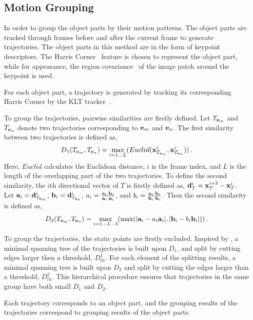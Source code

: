 \documentclass[10pt,twocolumn,letterpaper]{article}
\begin{document}
\subsection{Motion Grouping}
In order to group the object parts by their motion patterns. The object parts are tracked through frames before and after the current frame to generate trajectories. The object parts in this method are in the form of keypoint descriptors. The Harris Corner~\cite{harris} feature is chosen to represent the object part, while for appearance, the region covariance~\cite{regionc} of the image patch around the keypoint is used.

For each object part, a trajectory is generated by tracking its corresponding Harris Corner by the KLT tracker~\cite{ij2}.

To group the trajectories, pairwise similarities are firstly defined. Let $T_{{\bf{e}}_m}$ and $T_{{\bf{e}}_n}$ denote two trajectories corresponding to ${{\bf{e}}_m}$ and ${{\bf{e}}_n}$. The first similarity between two trajectories is defined as,
\[
{D_1}(T_{{\bf{e}}_m},T_{{\bf{e}}_n}) = \mathop {\max }\limits_{i=1...L} (Euclid({\bf{x}}^i_{T_{{\bf{e}}_m}},{\bf{x}}^i_{T_{{\bf{e}}_n}}))\:.
\]
Here, $Euclid$ calculates the Euclidean distance, $i$ is the frame index, and $L$ is the length of the overlapping part of the two trajectories.
To define the second similarity, the $i$th directional vector of $T$ is firstly defined as, ${\bf{d}}^i_T={\bf{x}}^{i+3}_{T}-{\bf{x}}^i_{T}$. Let ${\bf{a}}_i={\bf{d}}^i_{T_{{\bf{e}}_m}}$, ${\bf{b}}_i={\bf{d}}^i_{T_{{\bf{e}}_n}}$, $a_i=\frac{{{{\bf{a}}_i}\cdot{{\bf{b}}_i}}}{{{{\bf{a}}_i}\cdot{{\bf{a}}_i}}}$, and $b_i=\frac{{{{\bf{a}}_i}\cdot{{\bf{b}}_i}}}{{{{\bf{b}}_i}\cdot{{\bf{b}}_i}}}$. Then the second similarity is defined as,
\[
{D_2}(T_{{\bf{e}}_m},T_{{\bf{e}}_n})= \mathop {\max }\limits_{i=1...L-3} (\max (|{{\bf{a}}_i} - a_i {{\bf{a}}_i}|,|{{\bf{b}}_i} - b_i{{\bf{b}}_i}|))\:.
\]

To group the trajectories, the static points are firstly excluded. Inspired by \cite{my9}, a minimal spanning tree of the trajectories is built upon $D_1$, and split by cutting edges larger then a threshold, $D^1_{th}$. For each element of the splitting results, a minimal spanning tree is built upon $D_2$ and split by cutting the edges larger than a threshold, $D^2_{th}$. This hierarchical procedure ensures that trajectories in the same group have both small $D_1$ and $D_2$.

Each trajectory corresponds to an object part, and the grouping results of the trajectories correspond to grouping results of the object parts.
\end{document}
